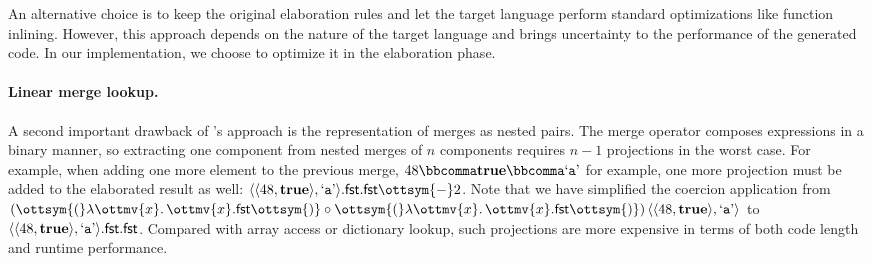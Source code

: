 An alternative choice is to keep the original elaboration rules and let the
target language perform standard optimizations like function inlining. However,
this approach depends on the nature of the target language and brings
uncertainty to the performance of the generated code. In our implementation, we
choose to optimize it in the elaboration phase.

\paragraph{Linear merge lookup.}
A second important drawback of \citeauthor{dunfield2014elaborating}'s approach
is the representation of merges as nested pairs. The merge operator composes
expressions in a binary manner, so extracting one component from nested merges
of $n$ components requires $n-1$ projections in the worst case. For example,
when adding one more element to the previous merge, $48  \bbcomma   \mathbf{true}   \bbcomma   \text{`\texttt{a}'} $ for
example, one more projection must be added to the elaborated result as well:
$   \langle   \langle  48 ,   \mathbf{true}   \rangle  ,   \text{`\texttt{a}'}   \rangle   . \mathsf{fst}   . \mathsf{fst}   \ottsym{-}  2$. Note that we have simplified the coercion
application from $(\ottsym{(}    \lambda \ottmv{x} .\, \ottmv{x}   . \mathsf{fst}   \ottsym{)}\circ\ottsym{(}    \lambda \ottmv{x} .\, \ottmv{x}   . \mathsf{fst}   \ottsym{)})\, \langle   \langle  48 ,   \mathbf{true}   \rangle  ,   \text{`\texttt{a}'}   \rangle $ to
$   \langle   \langle  48 ,   \mathbf{true}   \rangle  ,   \text{`\texttt{a}'}   \rangle   . \mathsf{fst}   . \mathsf{fst} $. Compared with array access or dictionary lookup,
such projections are more expensive in terms of both code length and runtime
performance.

